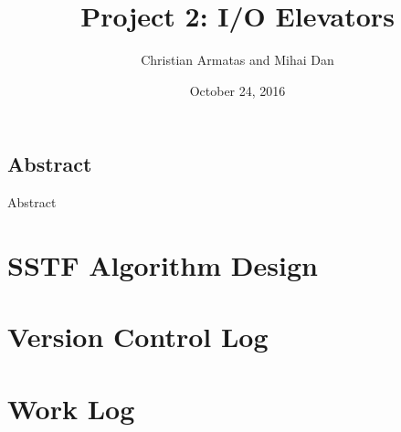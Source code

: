 \documentclass[letterpaper,10pt,onecolumn]{IEEEtran}
\title{Project 2: I/O Elevators}
\author{Christian Armatas and Mihai Dan}
\date{October 24, 2016}
\begin{document}
    \begin{center}
        \begin{minipage}[h]{\textwidth}
            \maketitle
        \end{minipage}
    \end{center}
    
    \vspace{140mm}
    
    \begin{center}
        \section*{Abstract}
        Abstract
    \end{center}
    
    \newpage
    
    
    \section*{SSTF Algorithm Design}

    
    \vspace{9mm}
    
    
    \section*{Version Control Log}

    
    \vspace{9mm}
    
    
    \section*{Work Log}
    
    
    \vspace{9mm}
    
    
\end{document}
